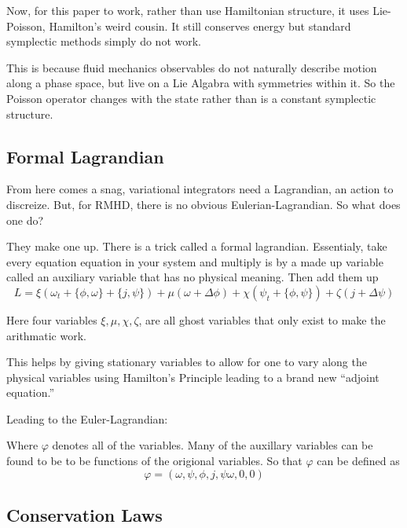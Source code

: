Now, for this paper to work, rather than use Hamiltonian structure, it uses Lie-Poisson, Hamilton's weird cousin. It still conserves energy but standard symplectic methods simply do not work.

This is because fluid mechanics observables do not naturally describe motion along a phase space, but live on a Lie Algabra with symmetries within it. So the Poisson operator changes with the state rather than is a constant symplectic structure.

\subsection{Formal Lagrandian}

From here comes a snag, variational integrators need a Lagrandian, an action to discreize. But, for RMHD, there is no obvious Eulerian-Lagrandian. So what does one do?

They make one up. There is a trick called a formal lagrandian. Essentialy, take every equation equation in your system and multiply is by a made up variable called an auxiliary variable that has no physical meaning. Then add them up
\[
	L = \xi\left(\omega_t + \{\phi,\omega\} + \{j,\psi\}\right)
	+ \mu\left(\omega + \Delta\phi\right)
	+ \chi\left(\psi_t + \{\phi,\psi\}\right)
	+ \zeta\left(j + \Delta\psi\right)
\]

Here four variables $ \xi, \mu, \chi, \zeta $, are all ghost variables that only exist to make the arithmatic work.

This helps by giving stationary variables to allow for one to vary along the physical variables using Hamilton's Principle leading to a brand new ``adjoint equation.''

Leading to the Euler-Lagrandian:


Where $\varphi$ denotes all of the variables. Many of the auxillary variables can be found to be to be functions of the origional variables. So that $\varphi$ can be defined as
\[
	\varphi = (\omega, \psi, \phi, j, \psi \omega, 0,0)
\]

\subsection{Conservation Laws}

